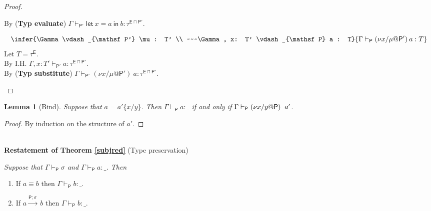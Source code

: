 \documentclass{sigplanconf}
\newcommand{\labp}{\mathsf P}
\newcommand{\labt}{\mathsf E}
\newcommand{\new}[2]{(\nu #1)\:#2}
\newcommand{\action}[1]{\stackrel{#1}{\longrightarrow}~}
\newcommand{\eval}[3]{\mathsf{let}~#1=#2~\mathsf{in}~#3}
\newcommand{\trule}[1]{(\textbf{Typ #1})}
\newtheorem{lemma}[definition]{Lemma}
\begin{document}
\begin{proof}
\begin{description}
By \trule{evaluate} $\Gamma \vdash_{\labp'} \eval x a b :  \tau^{\labt \sqcap \labp'}$.\\
\item[Case (Typ substitute)]
$$\infer
    {\Gamma \vdash_{\labp'} \mu : T' \\
    ~~~\Gamma, x: T' \vdash_{\labp} a : T}
    {\Gamma \vdash_{\labp} \new{x/\mu @\labp'} a : T}
$$
Let $T = \tau^{\labt}$.\\
By I.H. $\Gamma, x : T' \vdash_{\labp'} a : \tau^{\labt \sqcap \labp'}$.\\
By \trule{substitute} $\Gamma\! \vdash_{\labp'}\! \new{x/\mu @ \labp'}a :  \tau^{\labt \sqcap \labp'}.\!\!\!$\qedhere
\end{description}
\end{proof}
\begin{lemma}[Bind]\label{application} Suppose that $a = a'\{x/y\}$. Then $\Gamma \vdash_{\labp} a : \_$ if and only if $\Gamma \vdash_{\labp} \new{x/y@\labp}~a'$.
\end{lemma}
\begin{proof} By induction on the structure of $a'$.
\end{proof}
$ $\\
{\bf Restatement of Theorem \ref{subjred}} (Type preservation) {\em
  Suppose that $\Gamma \vdash_{\labp} \sigma$ and $\Gamma \vdash_{\labp} a : \_$. Then \begin{enumerate}
\item If $a \equiv b$ then $\Gamma \vdash_{\labp} b
  : \_$.
\item If $a \action{\labp;\sigma} b$ then $\Gamma \vdash_{\labp} b : \_$.
\end{enumerate}
}
\end{document}
